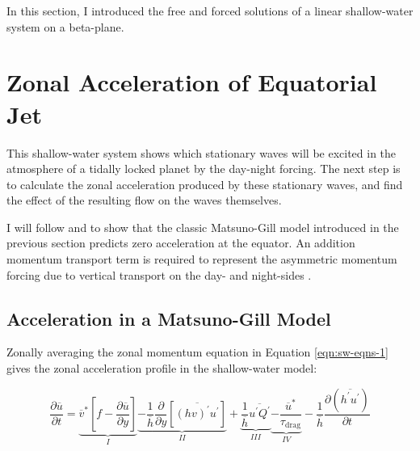 In this section, I introduced the free and forced solutions of a linear shallow-water system on a beta-plane.



\section{Zonal Acceleration of Equatorial Jet}\label{sec:zonal-acceleration}

This shallow-water system shows which stationary waves will be excited in the atmosphere of a tidally locked planet by the day-night forcing. The next step is to calculate the zonal acceleration produced by these stationary waves, and find the effect of the resulting flow on the waves themselves.

I will follow \citet{showman2010superrotation} and \citet{showman2011superrotation} to show that the classic Matsuno-Gill model introduced in the previous section predicts zero acceleration at the equator. An addition momentum transport term is required to represent the asymmetric momentum forcing due to vertical transport on the day- and night-sides \citet{shell2004superrotation}.


\subsection{Acceleration in a Matsuno-Gill Model}

Zonally averaging the zonal momentum equation in Equation \ref{eqn:sw-eqns-1} \citep{thuburn1999zonalmean} \citep{showman2010superrotation} gives the zonal acceleration profile in the shallow-water model:

\begin{equation}\label{eqn:zonal-mean-mom}
  \frac { \partial \overline { u } } { \partial t } = \underbrace { \overline { v } ^ { * } \left[ f - \frac { \partial \overline { u } } { \partial y } \right] } _ { I } \underbrace { - \frac { 1 } { \overline { h } } \frac { \partial } { \partial y } \left[ \overline { ( h v ) ^ { \prime } u ^ { \prime } } \right] } _ { I I } + \underbrace {  \frac { 1 } { \overline { h } } \overline { u ^ { \prime } Q ^ { \prime } } } _ { I I I } \underbrace { - \frac { \overline { u } ^ { * } } { \tau _ { \mathrm { drag } } } } _ { I V } - \frac { 1 } { \overline { h } } \frac { \partial \left( \overline { h ^ { \prime } u ^ { \prime } } \right) } { \partial t }
\end{equation}

